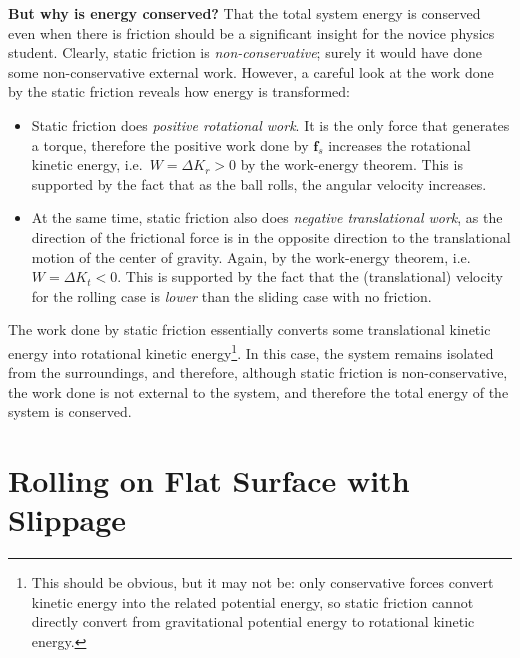 \documentclass{../../../oss-handout}
\begin{document}
\textbf{But why is energy conserved?} That the total system energy is conserved
even when there is friction should be a significant insight for the novice
physics student. Clearly, static friction is \emph{non-conservative}; surely it
would have done some non-conservative external work. However, a careful look at
the work done by the static friction reveals how energy is transformed:
\begin{itemize}[topsep=0pt]
\item Static friction does \emph{positive rotational work}. It is the only
  force that generates a torque, therefore the positive work done by $\bm{f}_s$
  increases the rotational kinetic energy, i.e.\ $W=\Delta K_r>0$ by the
  work-energy theorem. This is supported by the fact that as the ball rolls, the
  angular velocity increases.
\item At the same time, static friction also does \emph{negative translational
  work}, as the direction of the frictional force is in the opposite direction
  to the translational motion of the center of gravity. Again, by the
  work-energy theorem, i.e.\ $W=\Delta K_t<0$. This is supported by the fact
  that the (translational) velocity for the rolling case is \emph{lower} than
  the sliding case with no friction.
\end{itemize}
The work done by static friction essentially converts some translational kinetic
energy into rotational kinetic energy\footnote{This should be obvious, but it
  may not be: only conservative forces convert kinetic energy into the related
  potential energy, so static friction cannot directly convert from gravitational
  potential energy to rotational kinetic energy.}. In this case, the system
remains isolated from the surroundings, and therefore, although static friction
is non-conservative, the work done is not external to the system, and therefore
the total energy of the system is conserved.

\section{Rolling on Flat Surface with Slippage}
\end{document}
